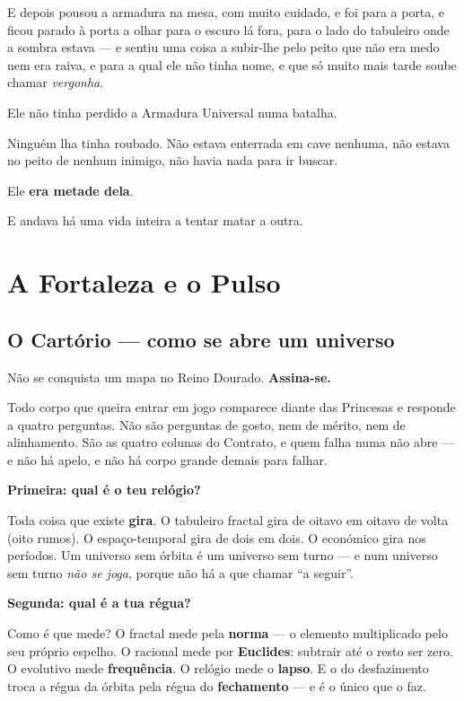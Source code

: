 \documentclass[livro.tex]{subfiles}
\begin{document}
E depois pousou a armadura na mesa, com muito cuidado, e foi para a porta, e ficou parado à porta a olhar para o
escuro lá fora, para o lado do tabuleiro onde a sombra estava --- e sentiu uma coisa a subir-lhe pelo peito que não
era medo nem era raiva, e para a qual ele não tinha nome, e que só muito mais tarde soube chamar \emph{vergonha}.

\medskip

Ele não tinha perdido a Armadura Universal numa batalha.

Ninguém lha tinha roubado. Não estava enterrada em cave nenhuma, não estava no peito de nenhum inimigo, não havia
nada para ir buscar.

\medskip

Ele \textbf{era metade dela}.

E andava há uma vida inteira a tentar matar a outra.


\part{A Fortaleza e o Pulso}

\chapter{O Cartório --- como se abre um universo}

Não se conquista um mapa no Reino Dourado. \textbf{Assina-se.}

Todo corpo que queira entrar em jogo comparece diante das Princesas e responde a quatro perguntas. Não são
perguntas de gosto, nem de mérito, nem de alinhamento. São as quatro colunas do Contrato, e quem falha numa não
abre --- e não há apelo, e não há corpo grande demais para falhar.

\medskip\noindent\textbf{Primeira: qual é o teu relógio?} 

Toda coisa que existe \textbf{gira}. O tabuleiro fractal gira de oitavo em oitavo de volta (oito rumos). O
espaço-temporal gira de dois em dois. O económico gira nos períodos. Um universo sem órbita é um universo sem
turno --- e num universo sem turno \emph{não se joga}, porque não há a que chamar ``a seguir''.

\medskip\noindent\textbf{Segunda: qual é a tua régua?}

Como é que mede? O fractal mede pela \textbf{norma} --- o elemento multiplicado pelo seu próprio
espelho. O racional mede por \textbf{Euclides}: subtrair até o resto ser zero. O evolutivo mede \textbf{frequência}.
O relógio mede o \textbf{lapso}. E o do desfazimento troca a régua da órbita pela régua do
\textbf{fechamento} --- e é o único que o faz.
\end{document}

